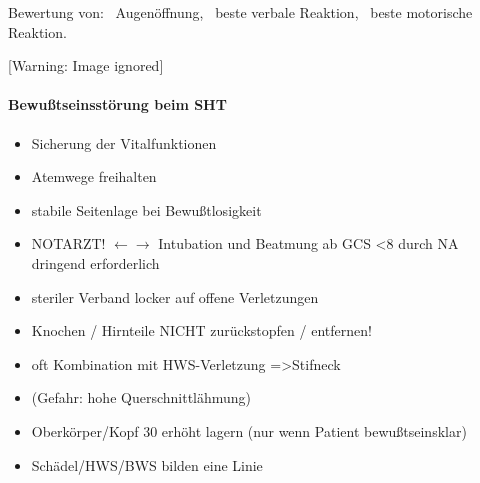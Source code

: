 \documentclass{article}
\begin{document}
{\mdseries
Bewertung von: {\textperiodcentered}~Augen\"offnung,
{\textperiodcentered}~beste verbale Reaktion,
{\textperiodcentered}~beste motorische Reaktion.}

\begin{center}
 [Warning: Image ignored] %

\end{center}
\paragraph{Bewu{\ss}tseinsst\"orung beim SHT}
\begin{itemize}
\item {\mdseries\color[rgb]{0.0,0.0,0.5019608}
Sicherung der Vitalfunktionen}

\item {\mdseries\color[rgb]{0.0,0.0,0.5019608}
Atemwege freihalten}

\item {\mdseries\color[rgb]{0.0,0.0,0.5019608}
stabile Seitenlage bei Bewu{\ss}tlosigkeit}

\item {\mdseries\color[rgb]{0.0,0.0,0.5019608}
NOTARZT! ${\leftarrow}$${\rightarrow}$ Intubation und Beatmung ab GCS
{\textless}8 durch NA dringend  erforderlich}

\item {\mdseries\color[rgb]{0.0,0.0,0.5019608}
steriler Verband locker auf offene  Verletzungen}

\item {\mdseries\color[rgb]{0.0,0.0,0.5019608}
Knochen / Hirnteile NICHT  zur\"uckstopfen /  entfernen!}

\item {\mdseries\color[rgb]{0.0,0.0,0.5019608}
oft Kombination mit HWS-Verletzung  ={\textgreater}Stifneck    }

\end{itemize}
\begin{itemize}
\item {\mdseries
(Gefahr: hohe Querschnittl\"ahmung)}

\end{itemize}
\begin{itemize}
\item {\mdseries\color[rgb]{0.0,0.0,0.5019608}
Oberk\"orper/Kopf 30{\textdegree} erh\"oht lagern (nur wenn Patient
bewu{\ss}tseinsklar)}

\item {\mdseries\color[rgb]{0.0,0.0,0.5019608}
Sch\"adel/HWS/BWS bilden eine Linie}

\end{itemize}
\end{document}
